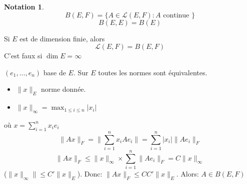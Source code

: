 \documentclass[a4paper]{report}
\theoremstyle{definition}
\newtheorem*{notation}{Notation}
\begin{document}
\begin{notation}
   \[
       B(E, F) = \{ A \in \mathcal{L}(E, F): A \text{ continue } \}
   \]  
   \[
   B(E, E) = B(E)
   \] 
\end{notation}
\begin{lemma}
   Si $E$ est de dimension finie, alors
   \[
       \mathcal{L}(E, F) = B(E, F)
   \] 
   C'est faux si $\dim E = \infty$
\end{lemma}
\begin{preuve}
    $(e_1, \ldots, e_n)$ base de $E$. Sur  $E$ toutes les normes sont équivalentes.  
    \begin{itemize}
        \item $\|x\|_E$ norme donnée.        
        \item $\|x\|_{\infty} = \max_{1 \le i \le n} |x_i|$ 
    \end{itemize}
    où $x = \sum_{i=1}^{n} x_ie_i$ 
    \[
    \|Ax\|_F = \|\sum_{i=1}^{n} x_iAe_i\| = \sum_{i=1}^{n} |x_i|\|Ae_i\|_F
    \] 
    \[
    \|Ax\|_F \le \|x\|_{\infty} \times \sum_{i=1}^{n} \|Ae_i\|_F = C\|x\|_{\infty}
    \] 
    ($\|x\|_{\infty}\| \le C'\|x\|_{E}$). Donc: $\|Ax\|_{F} \le CC'\|x\|_E$. Alors: $A \in B(E, F)$
\end{preuve}
\end{document}
